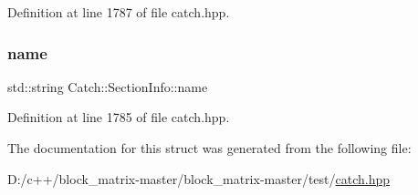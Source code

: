 Definition at line 1787 of file catch.\+hpp.

\mbox{\label{struct_catch_1_1_section_info_a704c8fc662d309137e0d4f199cb7df58}} 
\subsubsection{\texorpdfstring{name}{name}}
{\footnotesize\ttfamily std\+::string Catch\+::\+Section\+Info\+::name}



Definition at line 1785 of file catch.\+hpp.



The documentation for this struct was generated from the following file\+:\begin{DoxyCompactItemize}
\item 
D\+:/c++/block\+\_\+matrix-\/master/block\+\_\+matrix-\/master/test/\mbox{\hyperlink{catch_8hpp}{catch.\+hpp}}\end{DoxyCompactItemize}

